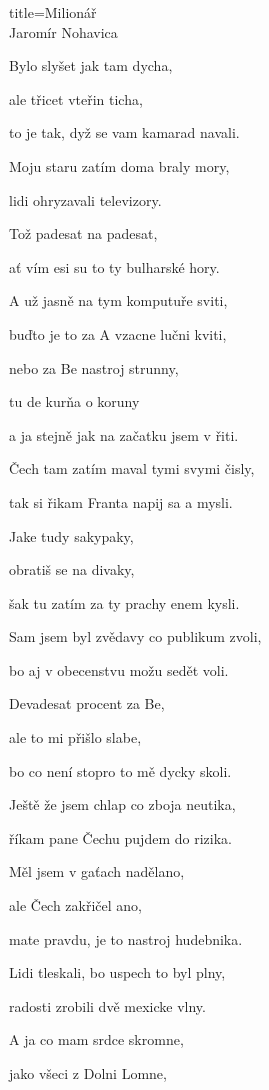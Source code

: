 \begin{song}{title=\predtitle\centering Milionář \\\large Jaromír Nohavica  \vspace*{-0.3cm}}
\begin{centerjustified}
\begin{varwidth}[t]{0.48\textwidth}
Bylo slyšet jak tam dycha,

ale třicet vteřin ticha,

to je tak, dyž se vam kamarad navali.

\sloka
Moju staru zatím doma braly mory,

lidi ohryzavali televizory.



\end{varwidth}\mezisloupci\begin{varwidth}[t]{0.5\textwidth}\setlength{\parindent}{\pindent}
\vspace*{0.60cm}  %

Tož padesat na padesat,

ať vím esi su to ty bulharské hory.

\sloka
A už jasně na tym komputuře sviti,

buďto je to za A vzacne lučni kviti,

nebo za Be nastroj strunny,

tu de kurňa o koruny

a ja stejně jak na začatku jsem v řiti.

\sloka
Čech tam zatím maval tymi svymi čisly,

tak si řikam Franta napij sa a mysli.

Jake tudy sakypaky,

obratiš se na divaky,

šak tu zatím za ty prachy enem kysli.

\sloka
Sam jsem byl zvědavy co publikum zvoli,

bo aj v obecenstvu možu sedět voli.

Devadesat procent za Be,

ale to mi přišlo slabe,

bo co není stopro to mě dycky skoli.

\sloka
Ještě že jsem chlap co zboja neutika,

říkam pane Čechu pujdem do rizika.

Měl jsem v gaťach nadělano,

ale Čech zakřičel ano,

mate pravdu, je to nastroj hudebnika.

\sloka
Lidi tleskali, bo uspech to byl plny,

radosti zrobili dvě mexicke vlny.

A ja co mam srdce skromne,

jako všeci z Dolni Lomne,


\end{varwidth}
\end{centerjustified}
\end{song}
